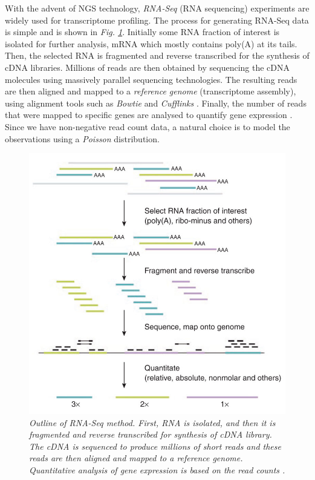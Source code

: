 With the advent of NGS technology, \emph{RNA-Seq} (RNA sequencing) experiments \citep{Wang2009} are widely used for transcriptome profiling. The process for generating RNA-Seq data is simple and is shown in \emph{Fig. \ref{rnaSeq-pic}}. Initially some RNA fraction of interest is isolated for further analysis, \eg mRNA which mostly contains poly(A) at its tails. Then, the selected RNA is fragmented and reverse transcribed for the synthesis of cDNA libraries. Millions of reads are then obtained by sequencing the cDNA molecules using massively parallel sequencing technologies. The resulting reads are then aligned and mapped to a \emph{reference genome} (\ie transcriptome assembly), using alignment tools such as \emph{Bowtie} \citep{Langmead2009} and \emph{Cufflinks} \citep{Trapnell2010}. Finally, the number of reads that were mapped to specific genes are analysed to quantify gene expression \citep{Pepke2009}. Since we have non-negative read count data, a natural choice is to model the observations using a \emph{Poisson} distribution.
\begin{figure}[!ht]
\begin{center}
 \includegraphics[scale = 0.37]{images/rna-seq}
\caption{\emph{Outline of RNA-Seq method. First, RNA is isolated, and then it is fragmented and reverse transcribed for synthesis of cDNA library. The cDNA is sequenced to produce millions of short reads and these reads are then aligned and mapped to a reference genome. Quantitative analysis of gene expression is based on the read counts \citep{Pepke2009}.}}
\label{rnaSeq-pic}
\end{center}
\end{figure}


